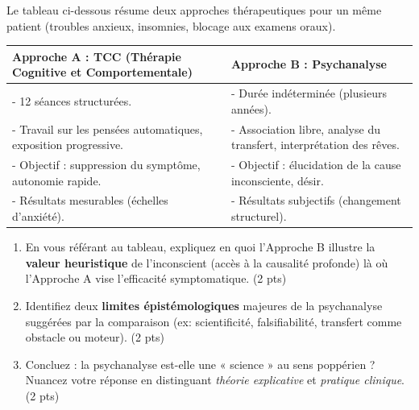\documentclass[11pt]{article}
\begin{document}
\begin{exercice}
Le tableau ci-dessous résume deux approches thérapeutiques pour un même patient (troubles anxieux, insomnies, blocage aux examens oraux).

\begin{center}
\begin{tabularx}{\linewidth}{>{\raggedright\arraybackslash}X >{\raggedright\arraybackslash}X}
\toprule
\textbf{Approche A : TCC (Thérapie Cognitive et Comportementale)} & \textbf{Approche B : Psychanalyse} \\
\midrule
- 12 séances structurées. & - Durée indéterminée (plusieurs années). \\
- Travail sur les pensées automatiques, exposition progressive. & - Association libre, analyse du transfert, interprétation des rêves. \\
- Objectif : suppression du symptôme, autonomie rapide. & - Objectif : élucidation de la cause inconsciente, désir. \\
- Résultats mesurables (échelles d'anxiété). & - Résultats subjectifs (changement structurel). \\
\bottomrule
\end{tabularx}
\end{center}

\begin{enumerate}
    \item En vous référant au tableau, expliquez en quoi l'Approche B illustre la \textbf{valeur heuristique} de l'inconscient (accès à la causalité profonde) là où l'Approche A vise l'efficacité symptomatique. (2 pts)
    \item Identifiez deux \textbf{limites épistémologiques} majeures de la psychanalyse suggérées par la comparaison (ex: scientificité, falsifiabilité, transfert comme obstacle ou moteur). (2 pts)
    \item Concluez : la psychanalyse est-elle une « science » au sens poppérien ? Nuancez votre réponse en distinguant \textit{théorie explicative} et \textit{pratique clinique}. (2 pts)
\end{enumerate}
\end{exercice}
\end{document}
